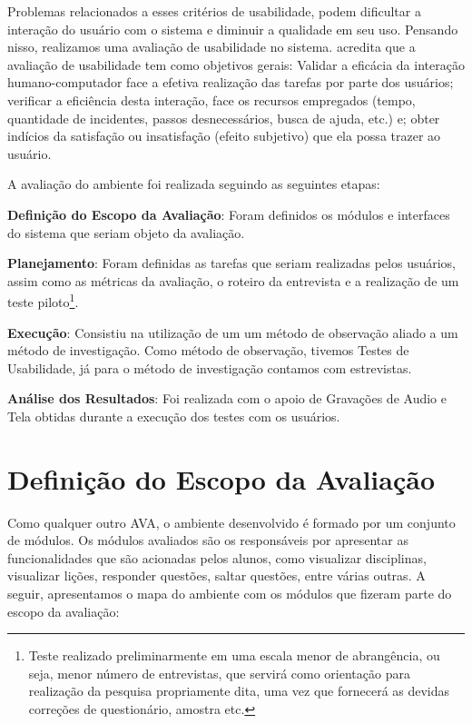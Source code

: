 Problemas relacionados a esses crit\'erios de usabilidade, podem dificultar a intera\c{c}\~ao do usu\'ario com o sistema e diminuir a 
qualidade em seu uso. Pensando nisso, realizamos uma avalia\c{c}\~ao de usabilidade no sistema.  acredita que a avalia\c{c}\~ao de usabilidade tem como objetivos gerais: Validar a eficácia da interação humano-computador face a efetiva realização das tarefas por parte dos usuários; verificar a eficiência desta interação, face os recursos empregados (tempo, quantidade de incidentes, passos desnecessários, 
busca de ajuda, etc.) e; obter indícios da satisfação ou insatisfação (efeito subjetivo) que ela possa trazer ao usuário.

A avaliação do ambiente foi realizada seguindo as seguintes etapas:

\begin{alineascomnumero}
	\item \textbf{Definição do Escopo da Avaliação}: Foram definidos os módulos e interfaces do sistema que seriam objeto da avaliação.
	\item \textbf{Planejamento}: Foram definidas as tarefas que seriam realizadas pelos usuários, assim como as métricas da avaliação, o roteiro da entrevista e a realização de um teste piloto\footnote{Teste realizado preliminarmente em uma escala menor de abrangência, ou seja, menor número de entrevistas, que servirá como orientação para realização da pesquisa propriamente dita, uma vez que fornecerá as devidas correções de questionário, amostra etc.}. 
	\item \textbf{Execução}: Consistiu na utilização de um um método de observação aliado a um método de investigação. Como método de observação, tivemos Testes de Usabilidade, já para o método de investigação contamos com estrevistas.
	\item \textbf{An\'alise dos Resultados}: Foi realizada com o apoio de Gravações de Audio e Tela obtidas durante a execução dos testes com os usuários.
\end{alineascomnumero}

\section{Definição do Escopo da Avalia\c{c}\~ao}
Como qualquer outro AVA, o ambiente desenvolvido é formado por um conjunto de módulos. Os módulos avaliados são os responsáveis por apresentar as funcionalidades que são acionadas pelos alunos, como visualizar disciplinas, visualizar lições, responder questões, saltar questões, entre várias outras. A seguir, apresentamos o mapa do ambiente com os módulos que fizeram parte do escopo da avaliação:

